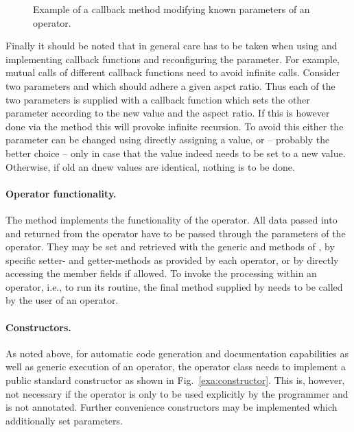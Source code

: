 \begin{figure}[h]

\caption{\label{exa:callback-method}Example of a callback method modifying known parameters of an operator.}
\end{figure}

Finally it should be noted that in general care has to be taken when using and implementing callback functions
and reconfiguring the parameter.
For example, mutual calls of different callback functions need to avoid infinite calls.
Consider two parameters  and  which should adhere a given aspct ratio.
Thus each of the two parameters is supplied with a callback function which sets the 
other parameter according to the new value and the aspect ratio.
If this is however done via the  method this will provoke infinite recursion.
To avoid this either the parameter can be changed using directly assigning a value,
or -- probably the better choice -- only in case that the value indeed needs to be set to a new value.
Otherwise, if old an dnew values are identical, nothing is to be done.

\paragraph{Operator functionality.}
The method  implements the functionality of the operator. All data
passed into and returned from the operator have to be passed through the parameters of the operator.
They may be set and retrieved with the generic
 and  methods
of , by specific setter- and getter-methods as provided by
each operator, or by
directly accessing the member fields if allowed.
To invoke the processing within an operator, i.e., to run its 
routine, the final method  supplied by  needs to be called by the user of an operator.

\paragraph{Constructors.}
As noted above, 
for automatic code generation and documentation capabilities as well as generic execution 
of an operator,
the operator class needs to implement 
a public standard constructor 
as shown in Fig.~\ref{exa:constructor}.
This is, however, not necessary if the operator is only to be used explicitly
by the programmer and is not annotated.
Further convenience constructors may be implemented which additionally set
parameters.

